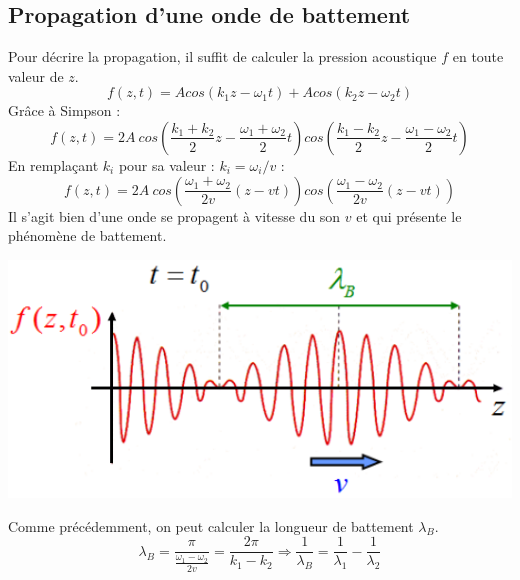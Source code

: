 \documentclass	[11pt, a4paper, openany]{book}
\begin{document}
\subsection{Propagation d'une onde de battement}
Pour décrire la propagation, il suffit de calculer la pression acoustique $f$ en toute valeur de $z$.
\begin{equation}
f(z, t) = Acos(k_1z - \omega_1 t) + Acos(k_2z - \omega_2 t)
\end{equation}
Grâce à Simpson : 
\begin{equation}
f(z, t) = 2A\ cos\left(\frac{k_1 + k_2}{2}z - \frac{\omega_1 + \omega_2}{2}t\right)cos\left(\frac{k_1 - k_2}{2}z - \frac{\omega_1 - \omega_2}{2}t\right)
\end{equation}
En remplaçant $k_i$ pour sa valeur  : $k_i = \omega_i/v$ :
\begin{equation}
f(z, t) = 2A\ cos\left(\frac{\omega_1 + \omega_2}{2v}(z - vt)\right)cos\left(\frac{\omega_1 - \omega_2}{2v}(z - vt)\right)
\end{equation}
Il s'agit bien d'une onde se propagent à vitesse du son $v$ et qui présente le phénomène de battement.
\begin{center}
\includegraphics[scale=0.4]{oo/image40.png}
\end{center}
Comme précédemment, on peut calculer la longueur de battement $\lambda_B$.
\begin{equation}
\lambda_B = \frac{\pi}{\frac{\omega_1 - \omega_2}{2v}} = \frac{2\pi}{k_1 - k_2} \Rightarrow \frac{1}{\lambda_B} = \frac{1}{\lambda_1} - \frac{1}{\lambda_2}
\end{equation}
\end{document}
